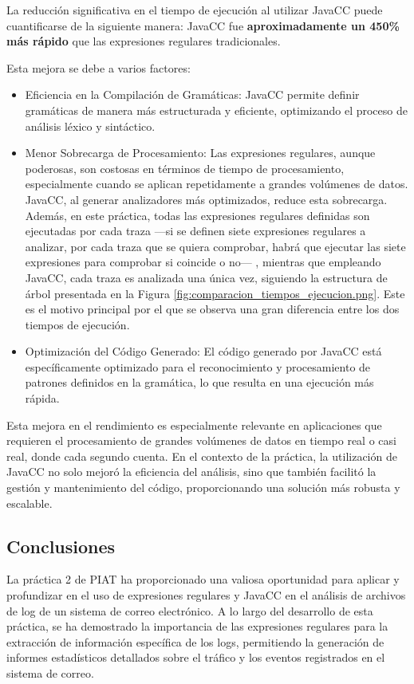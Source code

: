 La reducción significativa en el tiempo de ejecución al utilizar JavaCC puede cuantificarse de la siguiente manera: JavaCC fue \textbf{aproximadamente un 450\% más rápido} que las expresiones regulares tradicionales.

Esta mejora se debe a varios factores:

\begin{itemize}
\item Eficiencia en la Compilación de Gramáticas: JavaCC permite definir gramáticas de manera más estructurada y eficiente, optimizando el proceso de análisis léxico y sintáctico.
\item Menor Sobrecarga de Procesamiento: Las expresiones regulares, aunque poderosas, son costosas en términos de tiempo de procesamiento, especialmente cuando se aplican repetidamente a grandes volúmenes de datos. JavaCC, al generar analizadores más optimizados, reduce esta sobrecarga. Además, en este práctica, todas las expresiones regulares definidas son ejecutadas por cada traza ---si se definen siete expresiones regulares a analizar, por cada traza que se quiera comprobar, habrá que ejecutar las siete expresiones para comprobar si coincide o no--- , mientras que empleando JavaCC, cada traza es analizada una única vez, siguiendo la estructura de árbol presentada en la Figura \ref{fig:comparacion_tiempos_ejecucion.png}. Este es el motivo principal por el que se observa una gran diferencia entre los dos tiempos de ejecución.
\item Optimización del Código Generado: El código generado por JavaCC está específicamente optimizado para el reconocimiento y procesamiento de patrones definidos en la gramática, lo que resulta en una ejecución más rápida.
\end{itemize}

Esta mejora en el rendimiento es especialmente relevante en aplicaciones que requieren el procesamiento de grandes volúmenes de datos en tiempo real o casi real, donde cada segundo cuenta. En el contexto de la práctica, la utilización de JavaCC no solo mejoró la eficiencia del análisis, sino que también facilitó la gestión y mantenimiento del código, proporcionando una solución más robusta y escalable.

\subsection{Conclusiones}

\noindent La práctica 2 de PIAT ha proporcionado una valiosa oportunidad para aplicar y profundizar en el uso de expresiones regulares y JavaCC en el análisis de archivos de log de un sistema de correo electrónico. A lo largo del desarrollo de esta práctica, se ha demostrado la importancia de las expresiones regulares para la extracción de información específica de los logs, permitiendo la generación de informes estadísticos detallados sobre el tráfico y los eventos registrados en el sistema de correo.

